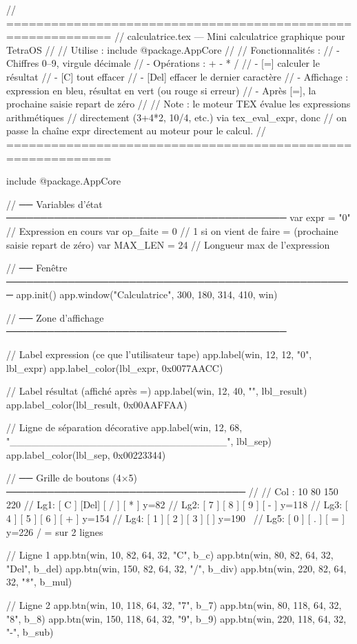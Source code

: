 // ============================================================
//  calculatrice.tex — Mini calculatrice graphique pour TetraOS
//
//  Utilise : include @package.AppCore
//
//  Fonctionnalités :
//    - Chiffres 0–9, virgule décimale
//    - Opérations : + - * /
//    - [=]   calculer le résultat
//    - [C]   tout effacer
//    - [Del] effacer le dernier caractère
//    - Affichage : expression en bleu, résultat en vert (ou rouge si erreur)
//    - Après [=], la prochaine saisie repart de zéro
//
//  Note : le moteur TEX évalue les expressions arithmétiques
//  directement (3+4*2, 10/4, etc.) via tex_eval_expr, donc
//  on passe la chaîne expr directement au moteur pour le calcul.
// ============================================================

include @package.AppCore

// ── Variables d'état ─────────────────────────────────────────
var expr     = "0"     // Expression en cours
var op_faite = 0       // 1 si on vient de faire = (prochaine saisie repart de zéro)
var MAX_LEN  = 24      // Longueur max de l'expression

// ── Fenêtre ───────────────────────────────────────────────────
app.init()
app.window("Calculatrice", 300, 180, 314, 410, win)

// ── Zone d'affichage ─────────────────────────────────────────

// Label expression (ce que l'utilisateur tape)
app.label(win, 12, 12, "0", lbl_expr)
app.label_color(lbl_expr, 0x0077AACC)

// Label résultat (affiché après =)
app.label(win, 12, 40, "", lbl_result)
app.label_color(lbl_result, 0x00AAFFAA)

// Ligne de séparation décorative
app.label(win, 12, 68, "______________________________", lbl_sep)
app.label_color(lbl_sep, 0x00223344)

// ── Grille de boutons (4×5) ───────────────────────────────────
//
//  Col :   10     80    150    220
//  Lg1:  [ C  ] [Del] [ / ] [ * ]    y=82
//  Lg2:  [ 7  ] [ 8 ] [ 9 ] [ - ]    y=118
//  Lg3:  [ 4  ] [ 5 ] [ 6 ] [ + ]    y=154
//  Lg4:  [ 1  ] [ 2 ] [ 3 ] [   ]    y=190   \
//  Lg5:  [  0   ] [ . ]     [ = ]    y=226   /  = sur 2 lignes

// Ligne 1
app.btn(win,  10, 82, 64, 32, "C",   b_c)
app.btn(win,  80, 82, 64, 32, "Del", b_del)
app.btn(win, 150, 82, 64, 32, "/",   b_div)
app.btn(win, 220, 82, 64, 32, "*",   b_mul)

// Ligne 2
app.btn(win,  10, 118, 64, 32, "7", b_7)
app.btn(win,  80, 118, 64, 32, "8", b_8)
app.btn(win, 150, 118, 64, 32, "9", b_9)
app.btn(win, 220, 118, 64, 32, "-", b_sub)

